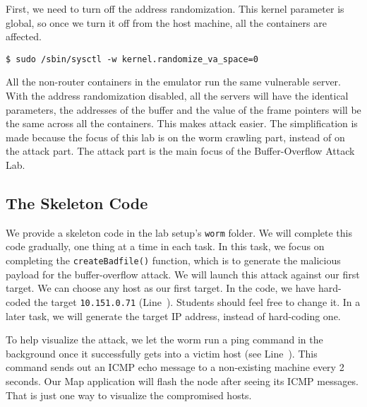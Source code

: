 First, we need to turn off the address randomization. This kernel parameter
is global, so once we turn it off from the host machine, all the containers
are affected. 

\begin{lstlisting}
$ sudo /sbin/sysctl -w kernel.randomize_va_space=0
\end{lstlisting}

All the non-router containers in the emulator run the same vulnerable server. 
With the address randomization disabled, 
all the servers will have the identical parameters, the addresses 
of the buffer and the value of the frame pointers will be the same
across all the containers. This makes attack easier. 
The simplification is made because the 
focus of this lab is on the worm crawling part, instead of on the attack 
part. The attack part is the main focus of the Buffer-Overflow 
Attack Lab.
 


\subsection{The Skeleton Code} 

We provide a skeleton code in the lab setup's \texttt{worm} 
folder. We will complete this code gradually, one thing 
at a time in each task. In this task, we focus 
on completing the \texttt{createBadfile()} function, 
which is to generate the malicious payload for the 
buffer-overflow attack. 
We will launch this attack against our first target.
We can choose any host as our first target. In the code, we have hard-coded
the target \texttt{10.151.0.71} (Line~\lineone). Students
should feel free to change it. In a later task, 
we will generate the target IP address, instead of 
hard-coding one. 

To help visualize the attack, we let the worm
run a ping command in the background once it successfully gets into a 
victim host (see Line~\linetwo).
This command sends out an ICMP echo message to 
a non-existing machine every 2 seconds. Our Map application
will flash the node after seeing its ICMP messages. 
That is just one way to visualize the compromised hosts.

